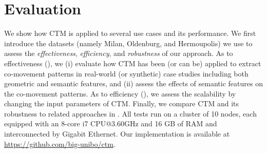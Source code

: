 \documentclass[preprint,12pt,authoryear]{elsarticle} %
\renewcommand{\sf}[1]{\textsf{\textup{#1}}}
\newcommand{\mf}[1]{#1}
\begin{document}
\section{Evaluation}\label{sec:test}
We show how CTM is applied to several use cases and its performance.
We first introduce the datasets (namely \sf{Milan}, \sf{Oldenburg}, and \sf{Hermoupolis}) we use to assess the \mf{
\textit{effectiveness}, \textit{efficiency}, and \textit{robustness}
} of our approach.
As to effectiveness (), we (i) evaluate how CTM has been (or can be) applied to extract co-movement patterns in real-world (or synthetic) case studies including both geometric and semantic features, and (ii) assess the effects of semantic features on the co-movement patterns. %
As to efficiency (), we assess the scalability by changing the input parameters of CTM. 
Finally, we compare CTM \mf{and its robustness} to related approaches in .
All tests run on a cluster of 10 nodes, each equipped with an 8-core i7 CPU@3.60GHz and 16 GB of RAM and interconnected by Gigabit Ethernet.
Our implementation is available at \url{https://github.com/big-unibo/ctm}.
\end{document}
